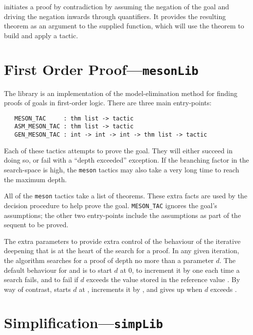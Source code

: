  initiates a proof by contradiction by assuming
the negation of the goal and driving the negation inwards through
quantifiers. It provides the resulting theorem as an argument to the
supplied function, which will use the theorem to build and apply a
tactic.

\section{First Order Proof---\texttt{mesonLib}}
\label{sec:mesonLib}

The  library is an implementation of the
model-elimination method for finding proofs of goals in first-order
logic.  There are three main entry-points:

\begin{verbatim}
   MESON_TAC     : thm list -> tactic
   ASM_MESON_TAC : thm list -> tactic
   GEN_MESON_TAC : int -> int -> int -> thm list -> tactic
\end{verbatim}

Each of these tactics attempts to prove the goal.  They will either
succeed in doing so, or fail with a ``depth exceeded'' exception.  If
the branching factor in the search-space is high, the \texttt{meson}
tactics may also take a very long time to reach the maximum depth.

All of the \texttt{meson} tactics take a list of theorems.  These
extra facts are used by the decision procedure to help prove the goal.
\texttt{MESON\_TAC} ignores the goal's assumptions; the other two
entry-points include the assumptions as part of the sequent to be
proved.

The extra parameters to  provide extra control of
the behaviour of the iterative deepening that is at the heart of the
search for a proof.  In any given iteration, the algorithm searches
for a proof of depth no more than a parameter $d$.  The default
behaviour for  and  is to start $d$
at 0, to increment it by one each time a search fails, and to fail if
$d$ exceeds the value stored in the reference value
.  By way of contrast,
 starts $d$ at , increments
it by , and gives up when $d$ exceeds .



\section{Simplification---\texttt{simpLib}}
\label{sec:simpLib}

